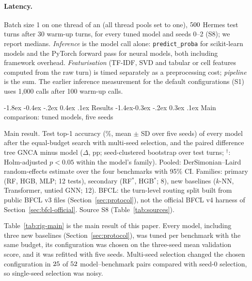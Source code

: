 \documentclass[10pt,twocolumn,letterpaper]{article}
\makeatletter
\renewcommand\section{\@startsection {section}{1}{\z@}%
  {-1.8ex \@plus -0.4ex \@minus -.2ex}%
  {0.4ex \@plus.1ex}%
  {\normalfont\normalsize\bfseries}}
\renewcommand\subsection{\@startsection{subsection}{2}{\z@}%
  {-1.4ex\@plus -0.3ex \@minus -.2ex}%
  {0.3ex \@plus .1ex}%
  {\normalfont\normalsize\bfseries}}
\makeatother
\begin{document}
\paragraph{Latency.} Batch size 1 on one thread of an \numCpuName{} (all thread pools set to one), $500$ Hermes test turns after 30 warm-up turns, for every tuned model and seeds 0--2 (S8); we report medians. \emph{Inference} is the model call alone: \texttt{predict\_\allowbreak{}proba} for scikit-learn models and the PyTorch forward pass for neural models, both including framework overhead. \emph{Featurisation} (TF-IDF, SVD and tabular or cell features computed from the raw turn) is timed separately as a preprocessing cost; \emph{pipeline} is the sum. The earlier inference measurement for the default configurations (S1) uses 1{,}000 calls after 100 warm-up calls.

\section{Results}\label{sec:results}
\subsection{Main comparison: tuned models, five seeds}\label{sec:main-comparison}
\begin{table}[t]
\centering
\scriptsize
\setlength{\tabcolsep}{3pt}
\caption{Main result. Test top-1 accuracy (\%, mean $\pm$ SD over five seeds) of every model after the equal-budget search with multi-seed selection, and the paired difference tree GNCA minus model ($\Delta$, pp; seed-clustered bootstrap over test turns; $^{\dagger}$: Holm-adjusted $p<0.05$ within the model's family). Pooled: DerSimonian--Laird random-effects estimate over the four benchmarks with 95\% CI. Families: primary (RF, HGB, MLP; 12 tests), secondary (RF$^\ast$, HGB$^\ast$; 8), new baselines ($k$-NN, Transformer, untied GNN; 12). BFCL: the turn-level routing split built from public BFCL v3 files (Section~\ref{sec:protocol}), not the official BFCL v4 harness of Section~\ref{sec:bfcl-official}. Source S8 (Table~\ref{tab:sources}).}
\label{tab:rig-main}

\end{table}

Table~\ref{tab:rig-main} is the main result of this paper. Every model, including three new baselines (Section~\ref{sec:protocol}), was tuned per benchmark with the same budget, its configuration was chosen on the three-seed mean validation score, and it was refitted with five seeds. Multi-seed selection changed the chosen configuration in $25$ of $52$ model--benchmark pairs compared with seed-0 selection, so single-seed selection was noisy.
\end{document}
